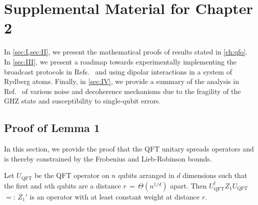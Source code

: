 \chapter{Supplemental Material for Chapter 2}
\label{app:qfo}
In \cref{sec:I,sec:II}, we present the mathematical proofs of results stated in \cref{ch:qfo}.
In \cref{sec:III}, we present a roadmap towards experimentally implementing the broadcast protocols in Refs.~\cite{Eldredge2017} and \cite{Tran2021a} using dipolar interactions in a system of Rydberg atoms.
Finally, in \cref{sec:IV}, we provide a summary of the analysis in Ref.~\cite{Eldredge2017} of various noise and decoherence mechanisms due to the fragility of the GHZ state and susceptibility to single-qubit errors.

\section{Proof of Lemma 1}
\label{sec:I}
In this section, we provide the proof that the QFT unitary spreads operators and is thereby constrained by the Frobenius and Lieb-Robinson bounds.

\begin{lemma} \label{lem_qft_weight_2}
Let $U_\mathrm{QFT}$ be the QFT operator on $n$ qubits arranged in $d$ dimensions such that the first and $n$th qubits are a distance $r$\,$=$\,$\Theta(n^{1/d})$ apart.
Then $U_\mathrm{QFT}^\dag Z_1 U_\mathrm{QFT}$\,$=:$\,$Z_1' $ is an operator with at least constant weight at distance $r$.
\end{lemma}

